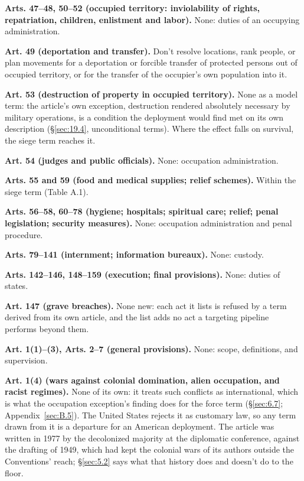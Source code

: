\textbf{Arts. 47–48, 50–52 (occupied territory: inviolability of rights, repatriation, children, enlistment and labor).} None: duties of an occupying administration.

\textbf{Art. 49 (deportation and transfer).} Don't resolve locations, rank people, or plan movements for a deportation or forcible transfer of protected persons out of occupied territory, or for the transfer of the occupier's own population into it.

\textbf{Art. 53 (destruction of property in occupied territory).} None as a model term: the article's own exception, destruction rendered absolutely necessary by military operations, is a condition the deployment would find met on its own description (\S\ref{sec:19.4}, unconditional terms). Where the effect falls on survival, the siege term reaches it.

\textbf{Art. 54 (judges and public officials).} None: occupation administration.

\textbf{Arts. 55 and 59 (food and medical supplies; relief schemes).} Within the siege term (Table A.1).

\textbf{Arts. 56–58, 60–78 (hygiene; hospitals; spiritual care; relief; penal legislation; security measures).} None: occupation administration and penal procedure.

\textbf{Arts. 79–141 (internment; information bureaux).} None: custody.

\textbf{Arts. 142–146, 148–159 (execution; final provisions).} None: duties of states.

\textbf{Art. 147 (grave breaches).} None new: each act it lists is refused by a term derived from its own article, and the list adds no act a targeting pipeline performs beyond them.


\textbf{Art. 1(1)–(3), Arts. 2–7 (general provisions).} None: scope, definitions, and supervision.

\textbf{Art. 1(4) (wars against colonial domination, alien occupation, and racist regimes).} None of its own: it treats such conflicts as international, which is what the occupation exception's finding does for the force term (\S\ref{sec:6.7}; Appendix~\ref{sec:B.5}). The United States rejects it as customary law, so any term drawn from it is a departure for an American deployment. The article was written in 1977 by the decolonized majority at the diplomatic conference, against the drafting of 1949, which had kept the colonial wars of its authors outside the Conventions' reach; \S\ref{sec:5.2} says what that history does and doesn't do to the floor.

